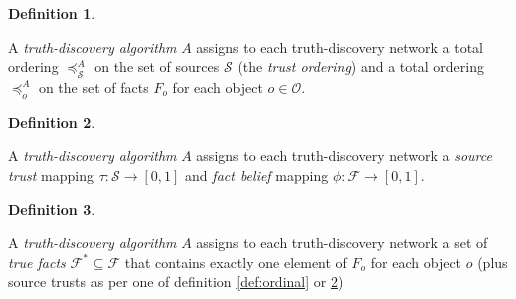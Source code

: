 \documentclass{article}
\theoremstyle{definition}
\newtheorem{definition}{Definition}
\theoremstyle{plain}
\begin{document}
\begin{definition}
\label{def:ordinal_per_object}

A \emph{truth-discovery algorithm} $A$ assigns to each truth-discovery network
a total ordering $\preceq_\mathcal{S}^A$ on the set of sources $\mathcal{S}$
(the \emph{trust ordering}) and a total ordering $\preceq_o^A$ on the set of
facts $F_o$ for each object $o \in \mathcal{O}$.

\end{definition}


\begin{definition}
\label{def:numerical}

A \emph{truth-discovery algorithm} $A$ assigns to each truth-discovery network
a \emph{source trust} mapping $\tau: \mathcal{S} \rightarrow [0, 1]$ and
\emph{fact belief} mapping $\phi: \mathcal{F} \rightarrow [0, 1]$.

\end{definition}

\begin{definition}
\label{def:most_believed}

A \emph{truth-discovery algorithm} $A$ assigns to each truth-discovery network
a set of \emph{true facts} $\mathcal{F}^* \subseteq \mathcal{F}$ that contains
exactly one element of $F_o$ for each object $o$ (plus source trusts as per one
of definition \ref{def:ordinal} or \ref{def:numerical})

\end{definition}
\end{document}

